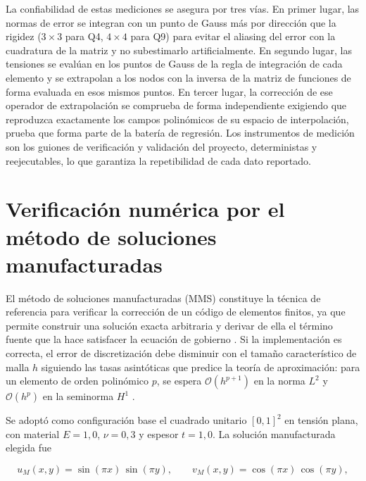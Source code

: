 La confiabilidad de estas mediciones se asegura por tres vías. En primer lugar, las normas de error se integran con un punto de Gauss más por dirección que la rigidez ($3\times3$ para Q4, $4\times4$ para Q9) para evitar el aliasing del error con la cuadratura de la matriz y no subestimarlo artificialmente. En segundo lugar, las tensiones se evalúan en los puntos de Gauss de la regla de integración de cada elemento y se extrapolan a los nodos con la inversa de la matriz de funciones de forma evaluada en esos mismos puntos. En tercer lugar, la corrección de ese operador de extrapolación se comprueba de forma independiente exigiendo que reproduzca exactamente los campos polinómicos de su espacio de interpolación, prueba que forma parte de la batería de regresión. Los instrumentos de medición son los guiones de verificación y validación del proyecto, deterministas y reejecutables, lo que garantiza la repetibilidad de cada dato reportado.

\section{Verificación numérica por el método de soluciones manufacturadas}

El método de soluciones manufacturadas (MMS) constituye la técnica de referencia para verificar la corrección de un código de elementos finitos, ya que permite construir una solución exacta arbitraria y derivar de ella el término fuente que la hace satisfacer la ecuación de gobierno \autocites[pp.~219-222]{oberkampf2010vv}[pp.~20-21]{salari2000mms}. Si la implementación es correcta, el error de discretización debe disminuir con el tamaño característico de malla $h$ siguiendo las tasas asintóticas que predice la teoría de aproximación: para un elemento de orden polinómico $p$, se espera $\mathcal{O}(h^{p+1})$ en la norma $L^2$ y $\mathcal{O}(h^{p})$ en la seminorma $H^1$ \autocites[pp.~106-107]{strang2008analysis}[pp.~189-190]{hughes2000fem}[p.~38]{zienkiewicz2013fem}.

Se adoptó como configuración base el cuadrado unitario $[0,1]^2$ en tensión plana, con material $E = 1{,}0$, $\nu = 0{,}3$ y espesor $t = 1{,}0$. La solución manufacturada elegida fue

\begin{equation}
u_M(x,y) = \sin(\pi x)\,\sin(\pi y), \qquad v_M(x,y) = \cos(\pi x)\,\cos(\pi y),
\label{eq:mms-solucion}
\end{equation}

